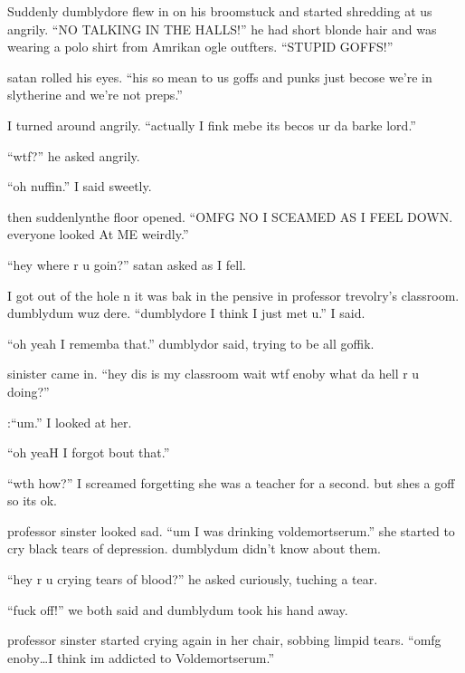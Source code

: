 Suddenly dumblydore flew in on his broomstuck and started shredding at us angrily. \enquote{NO TALKING IN THE HALLS\@!} he had short blonde hair and was wearing a polo shirt from Amrikan ogle outfters. \enquote{STUPID GOFFS\@!}

satan rolled his eyes. \enquote{his so mean to us goffs and punks just becose we're in slytherine and we're not preps.}

I turned around angrily. \enquote{actually I fink mebe its becos ur da barke lord.}

\enquote{wtf?} he asked angrily.

\enquote{oh nuffin.} I said sweetly.

then suddenlyn\dotfill the floor opened.\newline
\enquote{OMFG NO I SCEAMED AS I FEEL DOWN\@. everyone looked At ME weirdly.}

\enquote{hey where r u goin?} satan asked as I fell.

I got out of the hole n it was bak in the pensive in professor trevolry's classroom. dumblydum wuz dere. \enquote{dumblydore I think I just met u.} I said.

\enquote{oh yeah I rememba that.} dumblydor said, trying to be all goffik.

sinister came in. \enquote{hey dis is my classroom wait wtf enoby what da hell r u doing?}

:\enquote{um.} I looked at her.

\enquote{oh yeaH I forgot bout that.}

\enquote{wth how?} I screamed forgetting she was a teacher for a second. but shes a goff so its ok.

professor sinster looked sad. \enquote{um I was drinking voldemortserum.} she started to cry black tears of depression. dumblydum didn't know about them.

\enquote{hey r u crying tears of blood?} he asked curiously, tuching a tear.

\enquote{fuck off!} we both said and dumblydum took his hand away.

professor sinster started crying again in her chair, sobbing limp\-id tears. \enquote{omfg enoby\ldots I think im addicted to Voldemortserum.}

